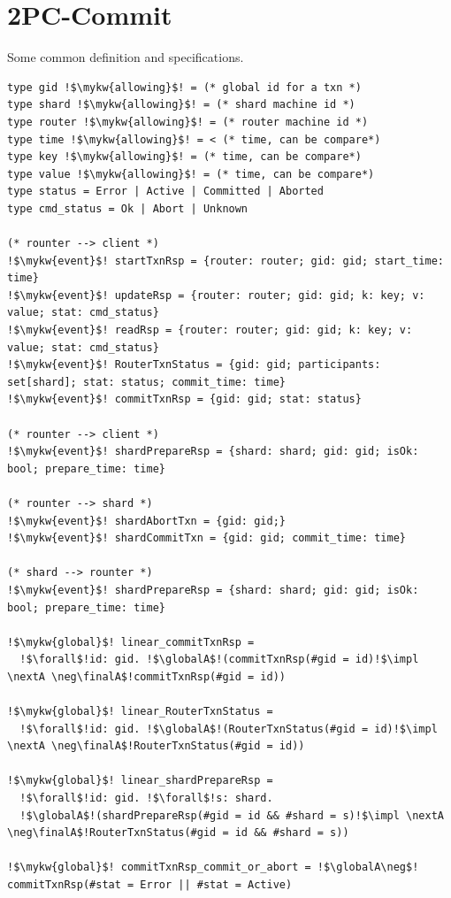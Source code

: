 \section{2PC-Commit}

Some common definition and specifications.

\begin{verbatim}
type gid !$\mykw{allowing}$! = (* global id for a txn *)
type shard !$\mykw{allowing}$! = (* shard machine id *)
type router !$\mykw{allowing}$! = (* router machine id *)
type time !$\mykw{allowing}$! = < (* time, can be compare*)
type key !$\mykw{allowing}$! = (* time, can be compare*)
type value !$\mykw{allowing}$! = (* time, can be compare*)
type status = Error | Active | Committed | Aborted
type cmd_status = Ok | Abort | Unknown

(* rounter --> client *)
!$\mykw{event}$! startTxnRsp = {router: router; gid: gid; start_time: time}
!$\mykw{event}$! updateRsp = {router: router; gid: gid; k: key; v: value; stat: cmd_status}
!$\mykw{event}$! readRsp = {router: router; gid: gid; k: key; v: value; stat: cmd_status}
!$\mykw{event}$! RouterTxnStatus = {gid: gid; participants: set[shard]; stat: status; commit_time: time}
!$\mykw{event}$! commitTxnRsp = {gid: gid; stat: status}

(* rounter --> client *)
!$\mykw{event}$! shardPrepareRsp = {shard: shard; gid: gid; isOk: bool; prepare_time: time}

(* rounter --> shard *)
!$\mykw{event}$! shardAbortTxn = {gid: gid;}
!$\mykw{event}$! shardCommitTxn = {gid: gid; commit_time: time}

(* shard --> rounter *)
!$\mykw{event}$! shardPrepareRsp = {shard: shard; gid: gid; isOk: bool; prepare_time: time}

!$\mykw{global}$! linear_commitTxnRsp =
  !$\forall$!id: gid. !$\globalA$!(commitTxnRsp(#gid = id)!$\impl \nextA \neg\finalA$!commitTxnRsp(#gid = id))

!$\mykw{global}$! linear_RouterTxnStatus =
  !$\forall$!id: gid. !$\globalA$!(RouterTxnStatus(#gid = id)!$\impl \nextA \neg\finalA$!RouterTxnStatus(#gid = id))

!$\mykw{global}$! linear_shardPrepareRsp =
  !$\forall$!id: gid. !$\forall$!s: shard. 
  !$\globalA$!(shardPrepareRsp(#gid = id && #shard = s)!$\impl \nextA \neg\finalA$!RouterTxnStatus(#gid = id && #shard = s))

!$\mykw{global}$! commitTxnRsp_commit_or_abort = !$\globalA\neg$! commitTxnRsp(#stat = Error || #stat = Active)

\end{verbatim}

